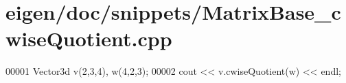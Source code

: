 \hypertarget{eigen_2doc_2snippets_2_matrix_base__cwise_quotient_8cpp_source}{}\section{eigen/doc/snippets/\+Matrix\+Base\+\_\+cwise\+Quotient.cpp}
\label{eigen_2doc_2snippets_2_matrix_base__cwise_quotient_8cpp_source}

\begin{DoxyCode}
00001 Vector3d v(2,3,4), w(4,2,3);
00002 cout << v.cwiseQuotient(w) << endl;
\end{DoxyCode}
